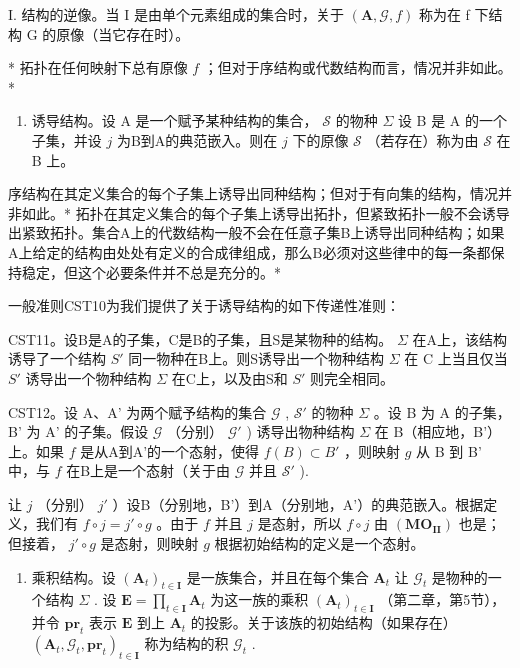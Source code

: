 I. 结构的逆像。当 I 是由单个元素组成的集合时，关于 \((\mathbf{A}, \mathcal{G}, f)\) 称为在 f 下结构 G 的原像（当它存在时）。

* 拓扑在任何映射下总有原像 \(f\) ；但对于序结构或代数结构而言，情况并非如此。*

\begin{enumerate}
\def\labelenumi{\Roman{enumi}.}
\setcounter{enumi}{1}
\tightlist
\item
  诱导结构。设 A 是一个赋予某种结构的集合， \(\mathcal{S}\) 的物种 \(\Sigma\) 设 B 是 A 的一个子集，并设 \(j\) 为B到A的典范嵌入。则在 \(j\) 下的原像 \(\mathcal{S}\) （若存在）称为由 \(\mathcal{S}\) 在 B 上。
\end{enumerate}

序结构在其定义集合的每个子集上诱导出同种结构；但对于有向集的结构，情况并非如此。* 拓扑在其定义集合的每个子集上诱导出拓扑，但紧致拓扑一般不会诱导出紧致拓扑。集合A上的代数结构一般不会在任意子集B上诱导出同种结构；如果A上给定的结构由处处有定义的合成律组成，那么B必须对这些律中的每一条都保持稳定，但这个必要条件并不总是充分的。*

一般准则CST10为我们提供了关于诱导结构的如下传递性准则：

CST11。设B是A的子集，C是B的子集，且S是某物种的结构。 \(\Sigma\) 在A上，该结构诱导了一个结构 \(S'\) 同一物种在B上。则S诱导出一个物种结构 \(\Sigma\) 在 C 上当且仅当 \(S'\) 诱导出一个物种结构 \(\Sigma\) 在C上，以及由S和 \(S'\) 则完全相同。

CST12。设 A、A' 为两个赋予结构的集合 \(\mathcal{G}\) , \(\mathcal{S}'\) 的物种 \(\Sigma\) 。设 B 为 A 的子集，B' 为 A' 的子集。假设 \(\mathcal{G}\) （分别） \(\mathcal{G}'\) ) 诱导出物种结构 \(\Sigma\) 在 B（相应地，B'）上。如果 \(f\) 是从A到A'的一个态射，使得 \(f(B) \subset B'\) ，则映射 \(g\) 从 B 到 B' 中，与 \(f\) 在B上是一个态射（关于由 \(\mathcal{G}\) 并且 \(\mathcal{S}'\) ).

让 \(j\) （分别） \(j'\) ）设B（分别地，B'）到A（分别地，A'）的典范嵌入。根据定义，我们有 \(f \circ j = j' \circ g\) 。由于 \(f\) 并且 \(j\) 是态射，所以 \(f \circ j\) 由 \((\mathbf{MO}_{\mathbf{II}})\) 也是；但接着， \(j' \circ g\) 是态射，则映射 \(g\) 根据初始结构的定义是一个态射。

\begin{enumerate}
\def\labelenumi{\Roman{enumi}.}
\setcounter{enumi}{2}
\tightlist
\item
  乘积结构。设 \((\mathbf{A}_t)_{t \in \mathbf{I}}\) 是一族集合，并且在每个集合 \(\mathbf{A}_t\) 让 \(\mathcal{G}_t\) 是物种的一个结构 \(\Sigma\) . 设 \(\mathbf{E} = \prod_{t \in \mathbf{I}} \mathbf{A}_t\) 为这一族的乘积 \((\mathbf{A}_t)_{t \in \mathbf{I}}\) （第二章，第5节），并令 \(\mathbf{pr}_t\) 表示 \(\mathbf{E}\) 到上 \(\mathbf{A}_t\) 的投影。关于该族的初始结构（如果存在） \((\mathbf{A}_t, \mathcal{G}_t, \mathbf{pr}_t)_{t \in \mathbf{I}}\) 称为结构的积 \(\mathcal{G}_t\) .
\end{enumerate}

